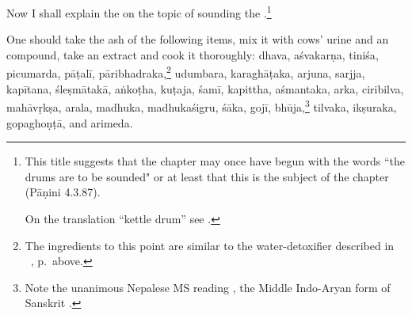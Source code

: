 \begin{translation}
    
    \item[1] 
    
Now I shall explain the  on the topic of
sounding the .\footnote{This title suggests
    that the chapter may once have begun with the words “the drums are to
    be sounded" or at least that this is the subject of the chapter
    (Pāṇini 4.3.87).
    
On the translation “kettle drum” see \cites[318]{hopk-1889}{ross-2014}.}
    
    \item[3] 
    
One should take the ash of the following items, mix it with cows'
urine and an  compound, take an extract and cook
it thoroughly: %
\gls{dhava}, \gls{aśvakarṇa}, \gls{tiniśa}, \gls{picumarda},
\gls{pāṭalī}, \gls{pāribhadraka},\footnote{\label{drum-detox}The
    ingredients to this point are similar to the water-detoxifier
    described in \SS\ , p.\,\pageref{water-detox} above.}
    \gls{udumbara}, \gls{karaghāṭaka}, \gls{arjuna}, \gls{sarjja},
    \gls{kapītana}, \gls{śleṣmātakā}, \gls{aṅkoṭha}, \gls{kuṭaja},
    \gls{śamī}, \gls{kapittha}, \gls{aśmantaka}, \gls{arka},
    \gls{ciribilva}, \gls{mahāvṛkṣa}, \gls{arala}, \gls{madhuka},
    \gls{madhukaśigru}, \gls{śāka}, \gls{gojī},
    \gls{bhūja},\footnote{Note the unanimous Nepalese MS reading
        , the Middle Indo-Aryan form of Sanskrit 
        \citep[\#9570]{CDIAL}.} \gls{tilvaka}, \gls{ikṣuraka},
        \gls{gopaghoṇṭā}, and \gls{arimeda}.
     

\end{translation}
